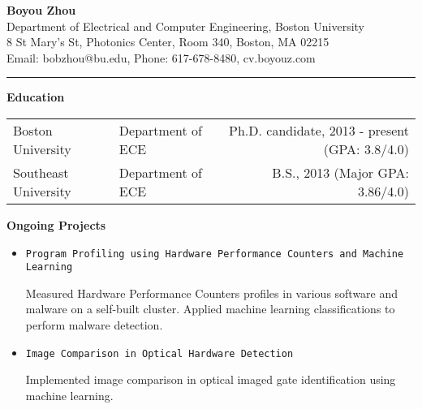 \documentclass[]{article}
\begin{document}
\pagestyle{empty}
\begin{center}
{\large\textbf{Boyou Zhou}}\\
Department of Electrical and Computer Engineering, Boston University\\
8 St Mary's St, Photonics Center, Room 340, Boston, MA 02215\\
Email: bobzhou@bu.edu, Phone: 617-678-8480, cv.boyouz.com\\
\rule[-0.1cm]{7.5in}{0.01cm}
\end{center}
%

\textbf{Education}
\begin{table*}[h]
  \begin{tabular}{p{2.0in}p{2.0in}r}
    Boston University& Department of ECE & Ph.D. candidate, 2013 - present
    (GPA: 3.8/4.0)\\ 
    Southeast University & Department of ECE & B.S., 2013
    (Major GPA: 3.86/4.0)\\ 
  \end{tabular}
  \label{tbl:1}
\end{table*}

\noindent \textbf{Ongoing Projects}
\begin{itemize}

		\item \verb+Program Profiling using Hardware Performance Counters and Machine Learning+

		Measured Hardware Performance Counters profiles in various software and
malware on a self-built cluster. Applied machine learning classifications to perform
malware detection.		

		\item \verb+Image Comparison in Optical Hardware Detection+

		Implemented image comparison in optical imaged gate identification
using machine learning.

		
\end{itemize}
\end{document}
